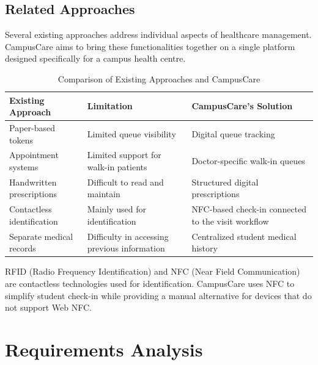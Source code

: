 \documentclass[a4paper,oneside,openany]{tietreport}
\begin{document}
\section{Related Approaches}

Several existing approaches address individual aspects of
healthcare management. CampusCare aims to bring these
functionalities together on a single platform designed
specifically for a campus health centre.

\begin{table}[htbp]
\centering
\caption{Comparison of Existing Approaches and CampusCare}
\label{tab:related_approaches}
\small
\begin{tabularx}{\textwidth}{XXX}
\toprule
\textbf{Existing Approach} &
\textbf{Limitation} &
\textbf{CampusCare's Solution} \\
\midrule

Paper-based tokens &
Limited queue visibility &
Digital queue tracking \\

Appointment systems &
Limited support for walk-in patients &
Doctor-specific walk-in queues \\

Handwritten prescriptions &
Difficult to read and maintain &
Structured digital prescriptions \\

Contactless identification &
Mainly used for identification &
NFC-based check-in connected to the visit workflow \\

Separate medical records &
Difficulty in accessing previous information &
Centralized student medical history \\

\bottomrule
\end{tabularx}
\end{table}

RFID (Radio Frequency Identification) and NFC (Near Field
Communication) are contactless technologies used for
identification. CampusCare uses NFC to simplify student
check-in while providing a manual alternative for devices
that do not support Web NFC.

\chapter{Requirements Analysis}
\end{document}
